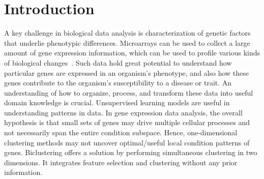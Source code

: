\section{Introduction}
\label{sec:introduction}
A key challenge in biological data analysis is  characterization of genetic factors that underlie phenotypic differences. 
Microarrays can be used
to collect a large amount of gene expression information,
which can be used to profile various kinds of biological
changes~\cite{huang2012parallelized}.
Such data hold great potential to understand how particular genes are expressed in an organism's phenotype, and also how these genes contribute to the organism's susceptibility to a disease or trait.
An understanding of how to organize, process, and transform these data into useful domain knowledge is crucial.
Unsupervised learning models are useful in understanding patterns in data.
In gene expression data analysis, the overall hypothesis is that small sets of genes may drive multiple cellular processes and not necessarily span the entire condition subspace. %
Hence, one-dimensional clustering methods may not uncover optimal/useful local condition patterns of genes.
Biclustering offers a solution by performing simultaneous clustering in two dimensions. It integrates feature selection and clustering without any prior information.


